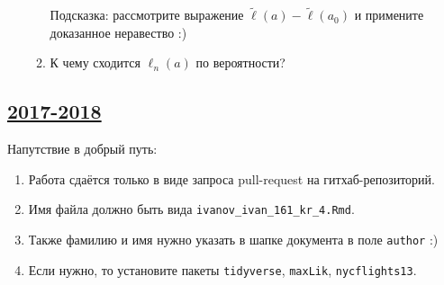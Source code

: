 \begin{enumerate}
\begin{enumerate}
Подсказка: рассмотрите выражение $\tilde \ell(a) - \tilde \ell(a_0)$ и примените доказанное неравество :)
\item К чему сходится $\ell_n(a)$ по вероятности?

\end{enumerate}


\end{enumerate}



\subsection[2017-2018]{\hyperref[sec:sol_kr_04_ip_2017_2018]{2017-2018}}
\label{sec:kr_04_ip_2017_2018}


Напутствие в добрый путь:

\begin{enumerate}
\item Работа сдаётся только в виде запроса pull-request на гитхаб-репозиторий.

\item Имя файла должно быть вида \verb|ivanov_ivan_161_kr_4.Rmd|.

\item Также фамилию и имя нужно указать в шапке документа в поле \verb|author| :)

\item Если нужно, то установите пакеты \verb|tidyverse|, \verb|maxLik|, \verb|nycflights13|.
\end{enumerate}


